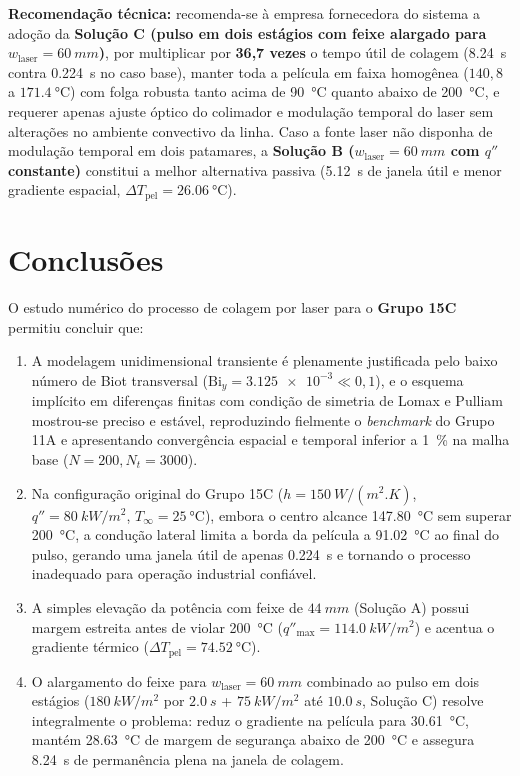 \documentclass[11pt,a4paper]{article}
\begin{document}
\textbf{Recomendação técnica:} recomenda-se à empresa fornecedora do sistema a adoção da \textbf{Solução C (pulso em dois estágios com feixe alargado para $w_{\text{laser}} = \SI{60}{mm}$)}, por multiplicar por \textbf{36,7 vezes} o tempo útil de colagem (\SI{8,24}{s} contra \SI{0,224}{s} no caso base), manter toda a película em faixa homogênea ($140{,}8$ a $\SI{171,4}{\celsius}$) com folga robusta tanto acima de \SI{90}{\celsius} quanto abaixo de \SI{200}{\celsius}, e requerer apenas ajuste óptico do colimador e modulação temporal do laser sem alterações no ambiente convectivo da linha. Caso a fonte laser não disponha de modulação temporal em dois patamares, a \textbf{Solução B ($w_{\text{laser}} = \SI{60}{mm}$ com $q''$ constante)} constitui a melhor alternativa passiva (\SI{5,12}{s} de janela útil e menor gradiente espacial, $\Delta T_{\text{pel}} = \SI{26,06}{\celsius}$).

\section{Conclusões}
O estudo numérico do processo de colagem por laser para o \textbf{Grupo 15C} permitiu concluir que:
\begin{enumerate}
    \item A modelagem unidimensional transiente é plenamente justificada pelo baixo número de Biot transversal ($\text{Bi}_y = \num{3,125e-3} \ll 0,1$), e o esquema implícito em diferenças finitas com condição de simetria de Lomax e Pulliam mostrou-se preciso e estável, reproduzindo fielmente o \textit{benchmark} do Grupo 11A e apresentando convergência espacial e temporal inferior a \SI{1}{\percent} na malha base ($N=200, N_t=3000$).
    \item Na configuração original do Grupo 15C ($h = \SI{150}{W/(m^2.K)}$, $q'' = \SI{80}{kW/m^2}$, $T_\infty = \SI{25}{\celsius}$), embora o centro alcance \SI{147,80}{\celsius} sem superar \SI{200}{\celsius}, a condução lateral limita a borda da película a \SI{91,02}{\celsius} ao final do pulso, gerando uma janela útil de apenas \SI{0,224}{s} e tornando o processo inadequado para operação industrial confiável.
    \item A simples elevação da potência com feixe de $\SI{44}{mm}$ (Solução A) possui margem estreita antes de violar \SI{200}{\celsius} ($q''_{\max} = \SI{114,0}{kW/m^2}$) e acentua o gradiente térmico ($\Delta T_{\text{pel}} = \SI{74,52}{\celsius}$).
    \item O alargamento do feixe para $w_{\text{laser}} = \SI{60}{mm}$ combinado ao pulso em dois estágios ($\SI{180}{kW/m^2}$ por $\SI{2,0}{s}$ + $\SI{75}{kW/m^2}$ até $\SI{10,0}{s}$, Solução C) resolve integralmente o problema: reduz o gradiente na película para \SI{30,61}{\celsius}, mantém \SI{28,63}{\celsius} de margem de segurança abaixo de \SI{200}{\celsius} e assegura \SI{8,24}{s} de permanência plena na janela de colagem.
\end{enumerate}
\end{document}
